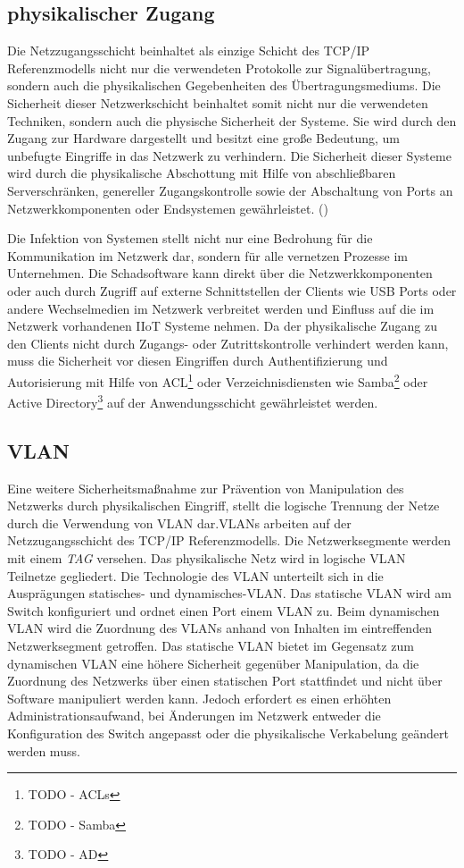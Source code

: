 \subsection{physikalischer Zugang}
Die Netzzugangsschicht beinhaltet als einzige Schicht des \ac{TCP}/\ac{IP} Referenzmodells nicht nur die verwendeten Protokolle zur Signalübertragung, sondern auch die physikalischen Gegebenheiten des Übertragungsmediums. Die Sicherheit dieser Netzwerkschicht beinhaltet somit nicht nur die verwendeten Techniken, sondern auch die physische Sicherheit der Systeme. Sie wird durch den Zugang zur Hardware dargestellt und besitzt eine große Bedeutung, um unbefugte Eingriffe in das Netzwerk zu verhindern. Die Sicherheit dieser Systeme wird durch die physikalische Abschottung mit Hilfe von abschließbaren Serverschränken, genereller Zugangskontrolle sowie der Abschaltung von Ports an Netzwerkkomponenten oder Endsystemen gewährleistet. (\cite{sichKom2017})

Die Infektion von Systemen stellt nicht nur eine Bedrohung für die Kommunikation im Netzwerk dar, sondern für alle vernetzen Prozesse im Unternehmen. Die Schadsoftware kann direkt über die Netzwerkkomponenten oder auch durch Zugriff auf externe Schnittstellen der Clients wie \ac{USB} Ports oder andere Wechselmedien im Netzwerk verbreitet werden und Einfluss auf die im Netzwerk vorhandenen \ac{IIoT} Systeme nehmen. Da der physikalische Zugang zu den Clients nicht durch Zugangs- oder Zutrittskontrolle verhindert werden kann, muss die Sicherheit vor diesen Eingriffen durch Authentifizierung und Autorisierung mit Hilfe von \ac{ACL}\footnote{TODO - ACLs} oder Verzeichnisdiensten wie Samba\footnote{TODO - Samba} oder Active Directory\footnote{TODO - AD} auf der Anwendungsschicht gewährleistet werden.

\subsection{\ac{VLAN}}
\label{Analyse:VLAN}
Eine weitere Sicherheitsmaßnahme zur Prävention von Manipulation des Netzwerks durch physikalischen Eingriff, stellt die logische Trennung der Netze durch die Verwendung von \ac{VLAN} dar.\ac{VLAN}s arbeiten auf der Netzzugangsschicht des \ac{TCP}/\ac{IP} Referenzmodells. Die Netzwerksegmente werden mit einem \textit{TAG} versehen. Das physikalische Netz wird in logische \ac{VLAN} Teilnetze gegliedert. Die Technologie des \ac{VLAN} unterteilt sich in die Ausprägungen statisches- und dynamisches-\ac{VLAN}. Das statische \ac{VLAN} wird am Switch konfiguriert und ordnet einen Port einem \ac{VLAN} zu. Beim dynamischen \ac{VLAN} wird die Zuordnung des \ac{VLAN}s anhand von Inhalten im eintreffenden Netzwerksegment getroffen. Das statische \ac{VLAN} bietet im Gegensatz zum dynamischen \ac{VLAN} eine höhere Sicherheit gegenüber Manipulation, da die Zuordnung des Netzwerks über einen statischen Port stattfindet und nicht über Software manipuliert werden kann. Jedoch erfordert es einen erhöhten Administrationsaufwand, bei Änderungen im Netzwerk entweder die Konfiguration des Switch angepasst oder die physikalische Verkabelung geändert werden muss.

